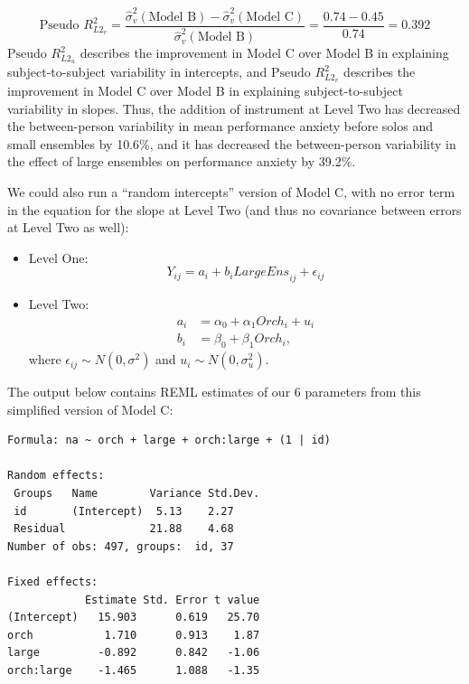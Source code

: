 \documentclass[
]{krantz}
\begin{document}
\begin{equation}
\textrm{Pseudo }R^2_{L2_v} = \frac{\hat{\sigma}_{v}^{2}(\textrm{Model B})-\hat{\sigma}_{v}^{2}(\textrm{Model C})}{\hat{\sigma}_{v}^{2}(\textrm{Model B})} = \frac{0.74-0.45}{0.74} = 0.392
\label{eq:pseudol1}
\end{equation}
\(\textrm{Pseudo }R^2_{L2_u}\) describes the improvement in Model C over Model B in explaining subject-to-subject variability in intercepts, and \(\textrm{Pseudo }R^2_{L2_v}\) describes the improvement in Model C over Model B in explaining subject-to-subject variability in slopes. Thus, the addition of instrument at Level Two has decreased the between-person variability in mean performance anxiety before solos and small ensembles by 10.6\%, and it has decreased the between-person variability in the effect of large ensembles on performance anxiety by 39.2\%.

We could also run a ``random intercepts'' version of Model C, with no error term in the equation for the slope at Level Two (and thus no covariance between errors at Level Two as well):

\begin{itemize}
\item
  Level One:
  \begin{equation}
  Y_{ij} = a_{i}+b_{i}\textstyle{LargeEns}_{ij}+\epsilon_{ij}
  \label{eq:level1modelcrandint}
  \end{equation}
\item
  Level Two:
  \begin{align*}
  a_{i} & = \alpha_{0}+\alpha_{1}\textstyle{Orch}_{i}+u_{i} \\
  b_{i} & = \beta_{0}+\beta_{1}\textstyle{Orch}_{i},
  \end{align*}
  where \(\epsilon_{ij}\sim N(0,\sigma^2)\) and \(u_{i}\sim N(0,\sigma_{u}^{2})\).
\end{itemize}

The output below contains REML estimates of our 6 parameters from this simplified version of Model C:

\begin{verbatim}
Formula: na ~ orch + large + orch:large + (1 | id)

Random effects:
 Groups   Name        Variance Std.Dev.
 id       (Intercept)  5.13    2.27    
 Residual             21.88    4.68    
Number of obs: 497, groups:  id, 37

Fixed effects:
            Estimate Std. Error t value
(Intercept)   15.903      0.619   25.70
orch           1.710      0.913    1.87
large         -0.892      0.842   -1.06
orch:large    -1.465      1.088   -1.35
\end{verbatim}
\end{document}
